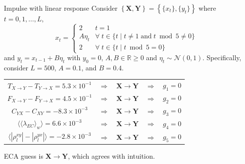 \documentclass{beamer}
\begin{document}
\begin{frame}{Impulse with linear response}
Consider $\left\{\mathbf{X},\mathbf{Y}\right\} = \left\{\{x_t\},\{y_t\}\right\}$ where $t=0,1,\ldots,L$,
\begin{equation*}
x_t = \left\{
  \begin{array}{lr}
    2 & t = 1\\
    A\eta_t & \forall\; t\in\{t\;|\;t\neq 1 \;\mathrm{and}\; t\bmod 5 \neq 0\}\\
    2 & \forall\; t\in\{t\;|\;t\bmod 5 = 0\}
  \end{array}
\right.
\end{equation*}
and $y_t = x_{t-1} + B\eta_t$ with $y_0 = 0$, $A,B\in\mathbb{R}\ge 0$ and $\eta_t\sim\mathcal{N}\left(0,1\right)$.  Specifically, consider $L=500$, $A=0.1$, and $B=0.4$.
\begin{center}
\begin{tabular}{ccccc}
$T_{X\rightarrow Y}-T_{Y\rightarrow X} = 5.3\times 10^{-1}$&$\Rightarrow$&$\mathbf{X}\rightarrow\mathbf{Y}$&$\Rightarrow$&$g_1 = 0$\\
$F_{X\rightarrow Y}-F_{Y\rightarrow X}=4.5\times 10^{-1}$&$\Rightarrow$&$\mathbf{X}\rightarrow\mathbf{Y}$&$\Rightarrow$&$g_2 = 0$\\
$C_{YX}-C_{XY}=-8.3\times 10^{-3}$&$\Rightarrow$&$\mathbf{X}\rightarrow\mathbf{Y}$&$\Rightarrow$&$g_3 = 0$\\
$\langle\langle\lambda_{EC}\rangle_w\rangle=6.6\times 10^{-3}$&$\Rightarrow$&$\mathbf{X}\rightarrow\mathbf{Y}$&$\Rightarrow$&$g_4 = 0$\\
$\langle|\rho^{xy}_l| - |\rho^{yx}_l|\rangle=-2.8\times 10^{-3}$&$\Rightarrow$&$\mathbf{X}\rightarrow\mathbf{Y}$&$\Rightarrow$&$g_5 = 0$
\end{tabular}
\end{center}
ECA guess is $\mathbf{X}\rightarrow\mathbf{Y}$, which agrees with intuition.
\end{frame}
\end{document}
